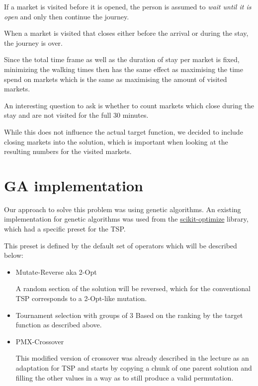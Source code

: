\documentclass[10pt]{scrartcl}
\begin{document}
If a market is visited before it is opened, the person is assumed to \emph{wait until it is open} and only then continue the journey.

When a market is visited that closes either before the arrival or during the stay, the journey is over.

Since the total time frame as well as the duration of stay per market is fixed, minimizing the walking times then has the same effect as maximising the time spend on markets which is the same as maximising the amount of visited markets.

An interesting question to ask is whether to count markets which close during the stay and are not visited for the full 30 minutes.

While this does not influence the actual target function, we decided to include closing markets into the solution, which is important when looking at the resulting numbers for the visited markets.

\section{GA implementation}

Our approach to solve this problem was using genetic algorithms.
An existing implementation for genetic algorithms was used from the \href{https://scikit-optimize.github.io/stable/}{scikit-optimize} library, which had a specific preset for the TSP.

This preset is defined by the default set of operators which will be described below:

\begin{itemize}
    \item Mutate-Reverse aka 2-Opt

    A random section of the solution will be reversed, which for the conventional TSP corresponds to a 2-Opt-like mutation.
    \item Tournament selection with groups of 3
    Based on the ranking by the target function as described above.
    \item PMX-Crossover
    
    This modified version of crossover was already described in the lecture as an adaptation for TSP and starts by copying a chunk of one parent solution and filling the other values in a way as to still produce a valid permutation.
\end{itemize}
\end{document}
